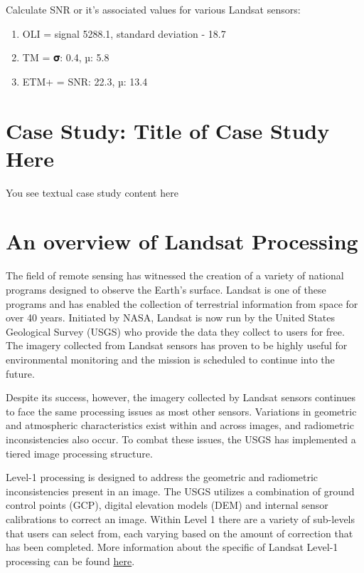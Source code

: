 \documentclass[
]{book}
\begin{document}
Calculate SNR or it's associated values for various Landsat sensors:

\begin{enumerate}
\def\labelenumi{\arabic{enumi}.}
\item
  OLI = signal 5288.1, standard deviation - 18.7
\item
  TM = 𝛔: 0.4, µ: 5.8
\item
  ETM+ = SNR: 22.3, µ: 13.4
\end{enumerate}

\hypertarget{case-study-title-of-case-study-here-5}{%
\section{Case Study: Title of Case Study Here}\label{case-study-title-of-case-study-here-5}}

You see textual case study content here

\hypertarget{an-overview-of-landsat-processing}{%
\section*{An overview of Landsat Processing}\label{an-overview-of-landsat-processing}}

The field of remote sensing has witnessed the creation of a variety of
national programs designed to observe the Earth's surface. Landsat is
one of these programs and has enabled the collection of terrestrial
information from space for over 40 years. Initiated by NASA, Landsat is
now run by the United States Geological Survey (USGS) who provide the
data they collect to users for free. The imagery collected from Landsat
sensors has proven to be highly useful for environmental monitoring and
the mission is scheduled to continue into the future.

Despite its success, however, the imagery collected by Landsat sensors
continues to face the same processing issues as most other sensors.
Variations in geometric and atmospheric characteristics exist within and
across images, and radiometric inconsistencies also occur. To combat
these issues, the USGS has implemented a tiered image processing
structure.

Level-1 processing is designed to address the geometric and radiometric
inconsistencies present in an image. The USGS utilizes a combination of
ground control points (GCP), digital elevation models (DEM) and internal
sensor calibrations to correct an image. Within Level 1 there are a
variety of sub-levels that users can select from, each varying based on
the amount of correction that has been completed. More information about
the specific of Landsat Level-1 processing can be found
\href{https://www.usgs.gov/core-science-systems/nli/landsat/landsat-level-1-processing-details}{here}.
\end{document}
